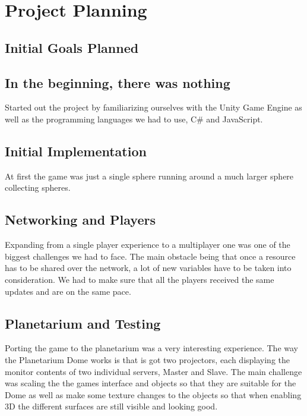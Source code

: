 \chapter{Project Planning}


\section{Initial Goals Planned}

\section{In the beginning, there was nothing}
Started out the project by familiarizing ourselves with the Unity Game Engine as well as the programming languages we had to use, C# and JavaScript.

\section{Initial Implementation}
At first the game was just a single sphere running around a much larger sphere collecting spheres.

\section{Networking and Players}
Expanding from a single player experience to a multiplayer one was one of the biggest challenges we had to face. The main obstacle being that once a resource has to be shared over the network, a lot of new variables have to be taken into consideration. We had to make sure that all the players received the same updates and are on the same pace.

\section{Planetarium and Testing}
Porting the game to the planetarium was a very interesting experience. The way the Planetarium Dome works is that is got two projectors, each displaying the monitor contents of two individual servers, Master and Slave. The main challenge was scaling the the games interface and objects so that they are suitable for the Dome as well as make some texture changes to the objects so that when enabling 3D the different surfaces are still visible and looking good.


